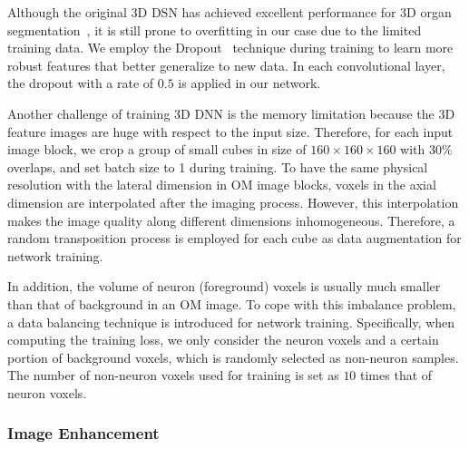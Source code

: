 Although the original 3D DSN has achieved excellent performance for 3D organ segmentation~\cite{Dou2017}, it is still prone to overfitting in our case due to the limited training data. 
We employ the Dropout~\cite{Srivastava2014} technique during training to learn more robust features that better generalize to new data.
In each convolutional layer, the dropout with a rate of $0.5$ is applied in our network. 



Another challenge of training 3D DNN is the memory limitation because the 3D feature images are huge with respect to the input size. Therefore, for each input image block, we crop a group of small cubes in size of $160\times 160\times 160$ with $30\%$ overlaps, and set batch size to 1 during training. 
%
To have the same physical resolution with the lateral dimension in OM image blocks, voxels in the axial dimension are interpolated after the imaging process. However, this interpolation makes the image quality along different dimensions inhomogeneous. 
Therefore, a random transposition process is employed for each cube as data augmentation for network training.


In addition, the volume of neuron (foreground) voxels is usually much smaller than that of background in an OM image.
To cope with this imbalance problem, a data balancing technique is introduced for network training.
Specifically, when computing the training loss, we only consider the neuron voxels and a certain portion of background voxels, which is randomly selected as non-neuron samples.
The number of non-neuron voxels used for training is set as $10$ times that of neuron voxels.

 

\subsubsection{Image Enhancement}
\label{sec:enhancement}


